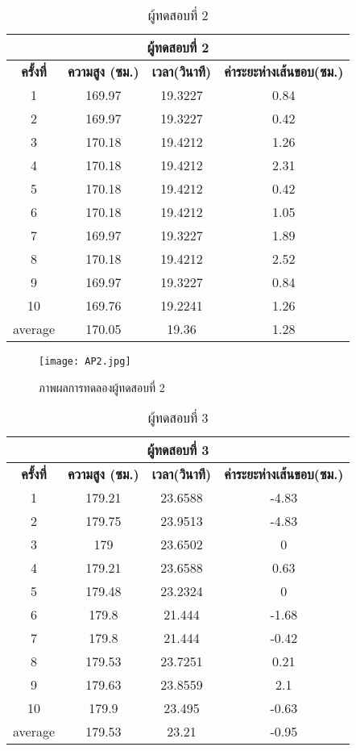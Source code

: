 \begin{table}[!hb] 
\centering
\caption{ผู้ทดสอบที่ 2}
\label{tab:2}
\begin{tabular}{|c|c|c|c|}
\hline
\multicolumn{4}{|c|}{\textbf{ผู้ทดสอบที่ 2}}    \\ \hline
\textbf{ครั้งที่} & \textbf{ความสูง (ซม.)} & \textbf{เวลา(วินาที)} & \textbf{ค่าระยะห่างเส้นขอบ(ซม.)}  \\ \hline
1       & 169.97 & 19.3227 & 0.84   \\ \hline
2       & 169.97 & 19.3227 & 0.42  \\ \hline
3       & 170.18 & 19.4212 & 1.26  \\ \hline
4       & 170.18 & 19.4212 & 2.31  \\ \hline
5       & 170.18 & 19.4212 & 0.42  \\ \hline
6       & 170.18 & 19.4212 & 1.05    \\ \hline
7       & 169.97 & 19.3227 & 1.89   \\ \hline
8       & 170.18 & 19.4212 & 2.52    \\ \hline
9       & 169.97 & 19.3227 & 0.84  \\ \hline
10      & 169.76 & 19.2241 & 1.26  \\ \hline
average & 170.05 & 19.36   & 1.28 \\ \hline
\end{tabular}
\end{table}

\begin{figure}[!ht]
\centering
\texttt{[image: AP2.jpg]}
\caption{ภาพผลการทดลองผู้ทดสอบที่ 2 }
\label{fig:AP2.jpg}
\end{figure}


\begin{table}[!hb] 
\centering
\caption{ผู้ทดสอบที่ 3}
\label{tab:3}
\begin{tabular}{|c|c|c|c|}
\hline
\multicolumn{4}{|c|}{\textbf{ผู้ทดสอบที่ 3}}    \\ \hline
\textbf{ครั้งที่} & \textbf{ความสูง (ซม.)} & \textbf{เวลา(วินาที)} & \textbf{ค่าระยะห่างเส้นขอบ(ซม.)} \\ \hline
1       & 179.21 & 23.6588 & -4.83  \\ \hline
2       & 179.75 & 23.9513 & -4.83      \\ \hline
3       & 179    & 23.6502 & 0        \\ \hline
4       & 179.21 & 23.6588 & 0.63     \\ \hline
5       & 179.48 & 23.2324 & 0        \\ \hline
6       & 179.8  & 21.444  & -1.68   \\ \hline
7       & 179.8  & 21.444  & -0.42     \\ \hline
8       & 179.53 & 23.7251 & 0.21    \\ \hline
9       & 179.63 & 23.8559 & 2.1   \\ \hline
10      & 179.9  & 23.495  & -0.63    \\ \hline
average & 179.53 & 23.21   & -0.95   \\ \hline
\end{tabular}
\end{table}

